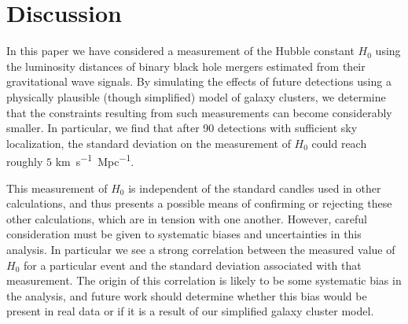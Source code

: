 \section{Discussion} \label{sec:conclusions}

In this paper we have considered a measurement of the Hubble constant $H_0$ using the luminosity distances of binary black hole mergers estimated from their gravitational wave signals.
By simulating the effects of future detections using a physically plausible (though simplified) model of galaxy clusters, we determine that the constraints resulting from such measurements can become considerably smaller.
In particular, we find that after 90 detections with sufficient sky localization, the standard deviation on the measurement of $H_0$ could reach roughly $5$ \si{km.s^{-1}.Mpc^{-1}}.

This measurement of $H_0$ is independent of the standard candles used in other calculations, and thus presents a possible means of confirming or rejecting these other calculations, which are in tension with one another.
However, careful consideration must be given to systematic biases and uncertainties in this analysis.
In particular we see a strong correlation between the measured value of $H_0$ for a particular event and the standard deviation associated with that measurement.
The origin of this correlation is likely to be some systematic bias in the analysis, and future work should determine whether this bias would be present in real data or if it is a result of our simplified galaxy cluster model.

